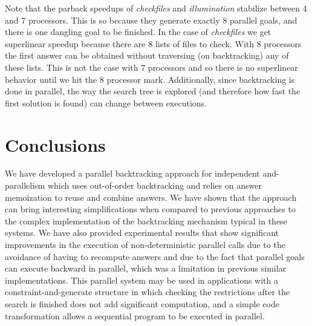 \documentclass{tlp}
\newcounter{mnotei} \setcounter{mnotei}{0}
\newcommand{\mnote}[1]{{\scriptsize\textsf{\textcolor{blue}{$^{[\themnotei]}$}}}\marginpar{\scriptsize\textsf{\textcolor{red}{n.\themnotei: #1}}}\stepcounter{mnotei} }
\renewcommand{\mnote}[1]{}
\newcommand{\compressection}{\vspace{-1em}}
\begin{document}
Note that the \textsf{parback} speedups of \emph{checkfiles} and
\emph{illumination} stabilize between 4 and 7 processors.  This is so
because they generate exactly 8 parallel goals, and there is one
dangling goal to be finished.  In the case of \emph{checkfiles} we get
superlinear speedup because there are 8 lists of files to check.  With
8 processors the first answer can be obtained without traversing (on
backtracking) any of these lists.  This is not the case with 7
processors 
and so there is no superlinear behavior until we hit the
8 processor mark.  
Additionally, since backtracking is done in parallel, the way the
search tree is explored (and therefore how fast the first solution is
found) can change between executions.





\compressection
\section{Conclusions}
\label{sec:conclusions}

We have developed a parallel backtracking approach for independent
and-paral\-lelism which uses out-of-order backtracking and relies on
answer memoization to reuse and combine answers. We have shown that
the approach can bring interesting simplifications when compared to
previous approaches to the complex implementation of the backtracking
mechanism typical in these systems. 
We have also provided experimental results that show significant
improvements in the execution of non-deterministic parallel calls due
to the avoidance of having to recompute answers and due to the fact
that parallel goals can execute backward in parallel, which was a
limitation in previous similar implementations. This parallel system
may be used in
applications
with a
constraint-and-generate
structure in which checking the
restrictions after the search is finished does not add significant
computation, and a simple code transformation allows a sequential
program to be executed in parallel.\mnote{But in general moving the
  checking after the generation greatly decreases performance to start
  with.  The cases in which this is not so can be very scarce.}






\end{document}
